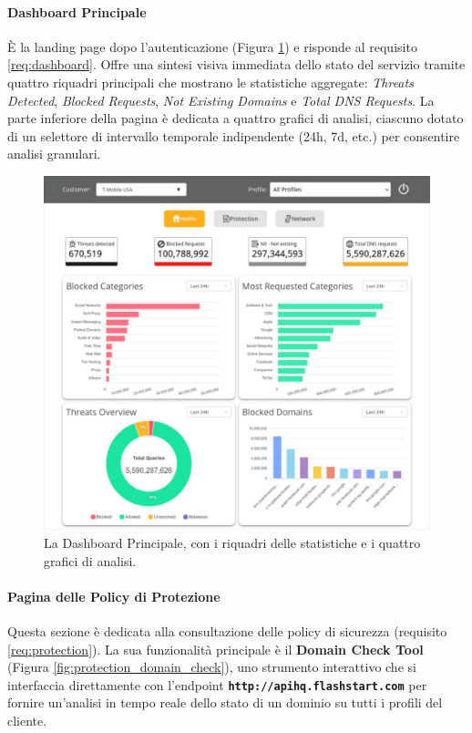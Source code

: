 \documentclass[12pt,a4paper,openright,twoside]{book}
\begin{document}
\paragraph{Dashboard Principale}
È la landing page dopo l'autenticazione (Figura \ref{fig:dashboard_page}) e risponde al requisito \ref{req:dashboard}. Offre una sintesi visiva immediata dello stato del servizio tramite quattro riquadri principali che mostrano le statistiche aggregate: \textit{Threats Detected}, \textit{Blocked Requests}, \textit{Not Existing Domains} e \textit{Total DNS Requests}. La parte inferiore della pagina è dedicata a quattro grafici di analisi, ciascuno dotato di un selettore di intervallo temporale indipendente (24h, 7d, etc.) per consentire analisi granulari. 

\begin{figure}[htbp]
    \centering
    \includegraphics[width=\textwidth]{figures/HOME.pdf}
    \caption{La Dashboard Principale, con i riquadri delle statistiche e i quattro grafici di analisi.}
    \label{fig:dashboard_page}
\end{figure}

\FloatBarrier 
\paragraph{Pagina delle Policy di Protezione}
Questa sezione è dedicata alla consultazione delle policy di sicurezza (requisito \ref{req:protection}). La sua funzionalità principale è il \textbf{Domain Check Tool} (Figura \ref{fig:protection_domain_check}), uno strumento interattivo che si interfaccia direttamente con l'endpoint \textbf{\texttt{http://apihq.flashstart.com}} per fornire un'analisi in tempo reale dello stato di un dominio su tutti i profili del cliente. 
\end{document}
